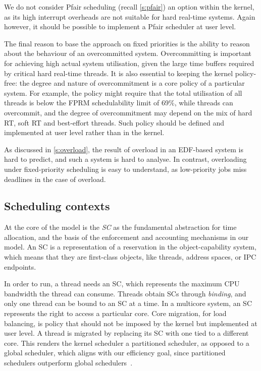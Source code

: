 We do not consider Pfair scheduling (recall \cref{s:pfair}) an option within the kernel, as its high interrupt
overheads are not suitable for hard real-time systems.  Again however, it
should be possible to implement a Pfair scheduler at user level.

The final reason to base the approach on fixed priorities is the ability
to reason about the behaviour of an
overcommitted system. Overcommitting is important for achieving high
actual system utilisation, given the large time buffers required by
critical hard real-time threads. It is also essential to keeping the kernel
policy-free: the degree and nature of overcommitment is a core policy
of a particular system. For example, the policy might require that the
total utilisation of all  threads is below the \gls{FPRM}
schedulability limit of 69\%, while  threads can overcommit,
and the degree of overcommitment may depend on the mix of hard RT,
soft RT and best-effort threads. Such policy should be defined and
implemented at user level rather than in the kernel.

As discussed in \cref{s:overload}, the result of overload in an
EDF-based system is hard to predict, and such a system is hard to
analyse. In contrast, overloading under fixed-priority scheduling is easy to
understand, as low-priority jobs miss deadlines in the case of overload.

\subsection{Scheduling contexts}
\label{sec:model-scheduling-contexts}

At the core of the model is the \emph{\gls{SC}} as the
fundamental abstraction for time allocation, and the basis of 
the enforcement and accounting mechanisms in our model.
An \gls{SC} is a representation
of a reservation in the object-capability system, which means that 
they are first-class objects, like threads, address spaces, or
\gls{IPC} endpoints. 

In order to run, a thread needs an \gls{SC}, which represents the
maximum CPU bandwidth the thread can consume. Threads obtain \glspl{SC} through \emph{binding}, and
only one thread can be bound to an \gls{SC} at a time.
In a multicore system, an SC represents the right to access a
particular core. Core migration, \eg for load balancing, is policy
that should not be imposed by the kernel but implemented at user
level. A thread is migrated by replacing its SC with one tied to a
different core. This renders the kernel scheduler a partitioned scheduler, as opposed to 
a global scheduler, which aligns with our efficiency goal, since partitioned schedulers outperform global
schedulers~\citep{Brandenburg:phd}.

